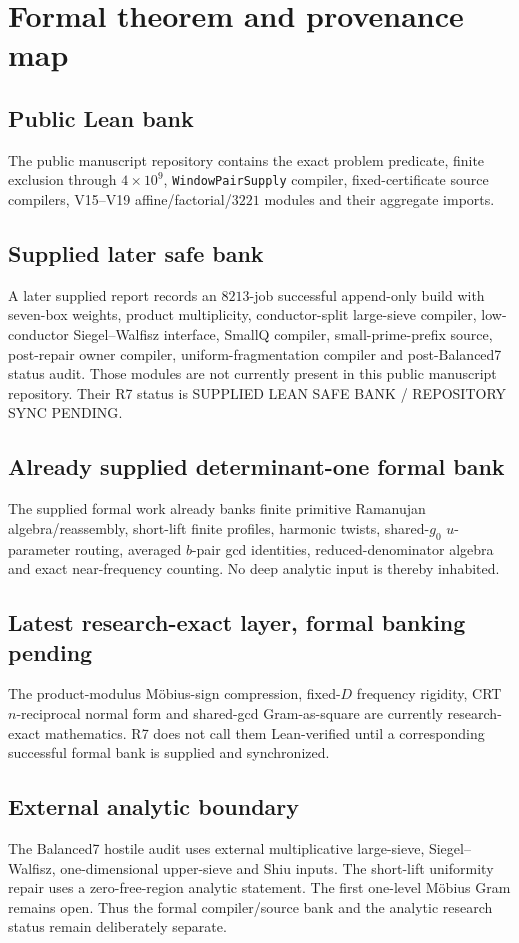 \documentclass[11pt]{article}
\theoremstyle{definition}
\newcommand{\1}{\mathbf 1}
\newcommand{\status}[1]{\textsf{#1}}
\begin{document}
\section{Formal theorem and provenance map}

\subsection*{Public Lean bank}
The public manuscript repository contains the exact problem predicate, finite exclusion
through $4\times10^9$, \texttt{WindowPairSupply} compiler, fixed-certificate source
compilers, V15--V19 affine/factorial/$3221$ modules and their aggregate imports.

\subsection*{Supplied later safe bank}
A later supplied report records an $8213$-job successful append-only build with
seven-box weights, product multiplicity, conductor-split large-sieve compiler,
low-conductor Siegel--Walfisz interface, SmallQ compiler, small-prime-prefix source,
post-repair owner compiler, uniform-fragmentation compiler and post-Balanced7 status audit.
Those modules are not currently present in this public manuscript repository.  Their R7
status is \status{SUPPLIED LEAN SAFE BANK / REPOSITORY SYNC PENDING}.

\subsection*{Already supplied determinant-one formal bank}
The supplied formal work already banks finite primitive Ramanujan algebra/reassembly,
short-lift finite profiles, harmonic twists, shared-$g_0$ $u$-parameter routing, averaged
$b$-pair gcd identities, reduced-denominator algebra and exact near-frequency counting.
No deep analytic input is thereby inhabited.

\subsection*{Latest research-exact layer, formal banking pending}
The product-modulus M\"obius-sign compression, fixed-$D$ frequency rigidity, CRT
$n$-reciprocal normal form and shared-gcd Gram-as-square are currently research-exact
mathematics.  R7 does not call them Lean-verified until a corresponding successful formal
bank is supplied and synchronized.

\subsection*{External analytic boundary}
The Balanced7 hostile audit uses external multiplicative large-sieve, Siegel--Walfisz,
one-dimensional upper-sieve and Shiu inputs.  The short-lift uniformity repair uses a
zero-free-region analytic statement.  The first one-level M\"obius Gram remains open.
Thus the formal compiler/source bank and the analytic research status remain deliberately
separate.
\end{document}

